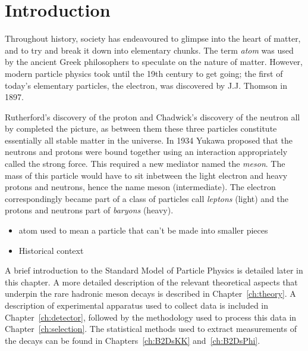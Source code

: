 \chapter{Introduction} 
\label{ch:introduction}

\minitoc 





Throughout history, society has endeavoured to glimpse into the heart of matter, and to try and break it down into elementary chunks.
The term \emph{atom} was used by the ancient Greek philosophers to speculate on the nature of matter. 
However, modern particle physics took until the 19th century to get going; the first of today's elementary particles, the electron, was discovered by J.J. Thomson in 1897.

Rutherford's discovery of the proton and Chadwick's discovery of the neutron all by completed the picture, as between them these three particles constitute essentially all stable matter in the universe.  
In 1934 Yukawa proposed that the neutrons and protons were bound together using an interaction appropriately called the strong force. This required a new mediator named the \emph{meson}. The mass of this particle would have to sit inbetween the light electron and heavy protons and neutrons, hence the name meson (intermediate). The electron correspondingly became part of a class of particles call \emph{leptons} (light) and the protons and neutrons part of \emph{baryons} (heavy). 

{\color{Red}
\begin{itemize}
\item atom used to mean a particle that can't be made into smaller pieces 
\item Historical context 
\end{itemize}}




A brief introduction to the Standard Model of Particle Physics is detailed later in this chapter. A more detailed description of the relevant theoretical aspects that underpin the rare hadronic \B meson decays is described in Chapter~\ref{ch:theory}. A description of experimental apparatus used to collect data is included in Chapter~\ref{ch:detector}, followed by the methodology used to process this data in Chapter~\ref{ch:selection}. The statistical methods used to extract measurements of the decays can be found in Chapters~\ref{ch:B2DsKK} and~\ref{ch:B2DsPhi}.


